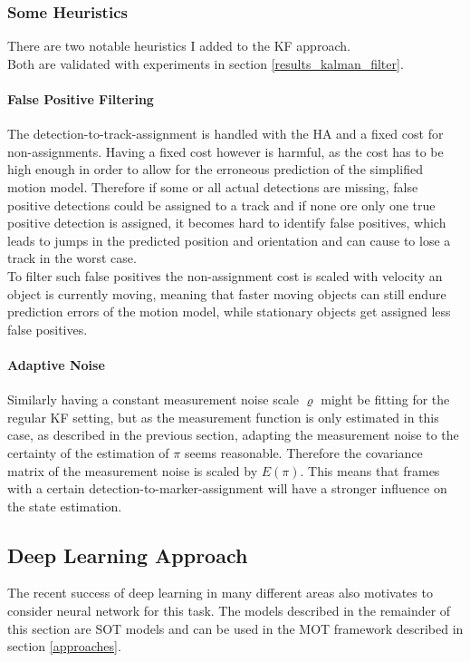 \documentclass{article}
\begin{document}
\subsubsection{Some Heuristics}
\label{heuristics}
There are two notable heuristics I added to the KF approach.\\ Both are validated with experiments in section \ref{results_kalman_filter}.

\paragraph{False Positive Filtering} The detection-to-track-assignment is handled with the HA and a fixed cost for non-assignments. Having a fixed cost however is harmful, as the cost has to be high enough in order to allow for the erroneous prediction of the simplified motion model. Therefore if some or all actual detections are missing, false positive detections could be assigned to a track and if none ore only one true positive detection is assigned, it becomes hard to identify false positives, which leads to jumps in the predicted position and orientation and can cause to lose a track in the worst case. \\
To filter such false positives the non-assignment cost is scaled with velocity an object is currently moving, meaning that faster moving objects can still endure prediction errors of the motion model, while stationary objects get assigned less false positives.

\paragraph{Adaptive Noise} Similarly having a constant measurement noise scale $\varrho$
might be fitting for the regular KF setting, but as the measurement function is only estimated in this case, as described in the previous section, adapting the measurement noise to the certainty of the estimation of $\pi$ seems reasonable. Therefore the covariance matrix of the measurement noise is scaled by $E(\pi)$. This means that frames with a certain detection-to-marker-assignment will have a stronger influence on the state estimation.


\subsection{Deep Learning Approach}
\label{dl_approach}

The recent success of deep learning in many different areas also motivates to consider neural network for this task. The models described in the remainder of this section are SOT models and can be used in the MOT framework described in section \ref{approaches}.
\end{document}

